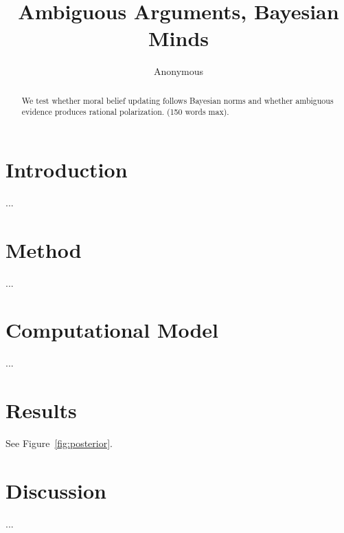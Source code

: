 \documentclass[man,apa7]{apa7}
\title{Ambiguous Arguments, Bayesian Minds}
\author{Anonymous}
\affiliation{ }
\begin{document}
\maketitle
\begin{abstract}
We test whether moral belief updating follows Bayesian norms and whether ambiguous evidence produces rational polarization. (150 words max).
\end{abstract}

\section{Introduction}
...

\section{Method}
...

\section{Computational Model}
...

\section{Results}
See Figure~\ref{fig:posterior}.

\section{Discussion}
...

\printbibliography
\end{document}
